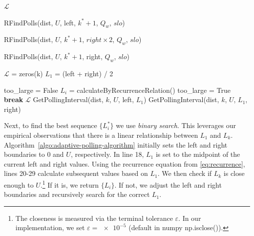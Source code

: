 {\begin{algorithm}[t!]
\begin{algorithmic}[1]
                \State \Return $\mathcal{L}$
            \EndIf

                \State \Return RFindPolls(dist, $U$, left, $k^*+1$, $Q_w$, $slo$)
            \EndIf

                \State \Return RFindPolls(dist, $U$, $k^*+1$, $right\times2$, $Q_w$, $slo$)
            \EndIf

            \State \Return RFindPolls(dist, $U$, $k^*+1$, right, $Q_w$, $slo$)
            
        \EndProcedure
            \State $\mathcal{L}$ = zeros(k)
            \State $L_1$ = (left + right) / 2

            \State too\_large = False
                \State $L_i$ = calculateByRecurrenceRelation()
                    \State too\_large = True
                    \State \textbf{break}
                \EndIf
            \EndFor
                \State \Return $\mathcal{L}$
            \EndIf
                \State \Return GetPollingInterval(dist, $k$, $U$, left, $L_1$)
            \EndIf
            \State \Return GetPollingInterval(dist, $k$, $U$, $L_1$, right)
        \EndProcedure
    \end{algorithmic}
\end{algorithm}

Next, to find the best sequence $\{L_i^{\!*}\}$
we use {\it binary search}. This leverages our empirical observations that there is a linear relationship between $L_1$ and $L_k$.
Algorithm~\ref{algo:adaptive-polling-algorithm} initially sets the left and right boundaries to 0 and $U$, respectively. In line 18, $L_1$ is set to the midpoint of the current left and right values. Using the recurrence equation from \eqref{eq:recurrence}, lines 20-29 calculate subsequent values based on $L_1$. We then check if $L_k$ is close enough to $U$.\footnote{The closeness is measured via the
{terminal tolerance $\varepsilon$}. 
{In our implementation, we set $\varepsilon=\num{e-5}$ (default in numpy np.isclose()).} 
}
If it is, we return $\{L_i\}$.  If not, we adjust the left and right boundaries and recursively search for the correct $L_1$.


}
